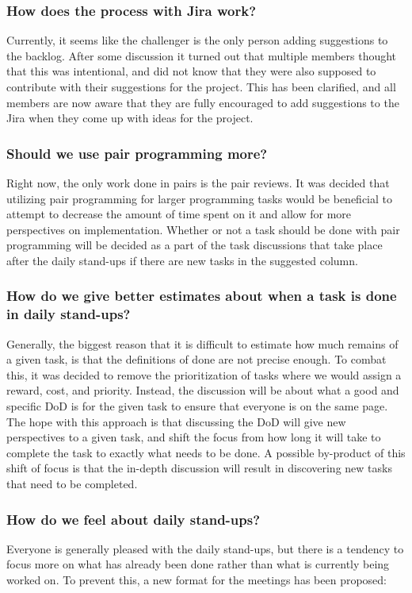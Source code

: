 \subsubsection{How does the process with Jira work?}
Currently, it seems like the challenger is the only person adding suggestions to the backlog.
After some discussion it turned out that multiple members thought that this was intentional, and did not know that they were also supposed to contribute with their suggestions for the project.
This has been clarified, and all members are now aware that they are fully encouraged to add suggestions to the Jira when they come up with ideas for the project.

\subsubsection{Should we use pair programming more?}
Right now, the only work done in pairs is the pair reviews.
It was decided that utilizing pair programming for larger programming tasks would be beneficial to attempt to decrease the amount of time spent on it and allow for more perspectives on implementation.
Whether or not a task should be done with pair programming will be decided as a part of the task discussions that take place after the daily stand-ups if there are new tasks in the suggested column.

\subsubsection{How do we give better estimates about when a task is done in daily stand-ups?}
Generally, the biggest reason that it is difficult to estimate how much remains of a given task, is that the definitions of done are not precise enough.
To combat this, it was decided to remove the prioritization of tasks where we would assign a reward, cost, and priority.
Instead, the discussion will be about what a good and specific DoD is for the given task to ensure that everyone is on the same page.
The hope with this approach is that discussing the DoD will give new perspectives to a given task, and shift the focus from how long it will take to complete the task to exactly what needs to be done.
A possible by-product of this shift of focus is that the in-depth discussion will result in discovering new tasks that need to be completed.

\subsubsection{How do we feel about daily stand-ups?}
Everyone is generally pleased with the daily stand-ups, but there is a tendency to focus more on what has already been done rather than what is currently being worked on.
To prevent this, a new format for the meetings has been proposed:

